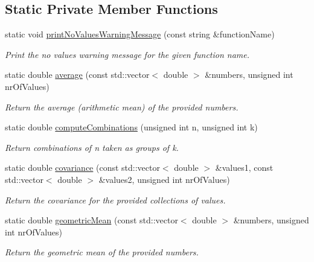 \subsection*{Static Private Member Functions}
\begin{DoxyCompactItemize}
\item 
static void \hyperlink{classmultiscale_1_1Numeric_afc1b351417949b1806e9faca7156d1a7}{print\-No\-Values\-Warning\-Message} (const string \&function\-Name)
\begin{DoxyCompactList}\small\item\em Print the no values warning message for the given function name. \end{DoxyCompactList}\item 
static double \hyperlink{classmultiscale_1_1Numeric_a0b02b3eadc399bb8d6a0d8cc3e5d9cf6}{average} (const std\-::vector$<$ double $>$ \&numbers, unsigned int nr\-Of\-Values)
\begin{DoxyCompactList}\small\item\em Return the average (arithmetic mean) of the provided numbers. \end{DoxyCompactList}\item 
static double \hyperlink{classmultiscale_1_1Numeric_a25ddac32c20b88732528d310dcc7a628}{compute\-Combinations} (unsigned int n, unsigned int k)
\begin{DoxyCompactList}\small\item\em Return combinations of n taken as groups of k. \end{DoxyCompactList}\item 
static double \hyperlink{classmultiscale_1_1Numeric_acc3adb44062cc1e70f697bd072e69b3b}{covariance} (const std\-::vector$<$ double $>$ \&values1, const std\-::vector$<$ double $>$ \&values2, unsigned int nr\-Of\-Values)
\begin{DoxyCompactList}\small\item\em Return the covariance for the provided collections of values. \end{DoxyCompactList}\item 
static double \hyperlink{classmultiscale_1_1Numeric_aaf89a75c6e933cd6e736f2ba4db0f76f}{geometric\-Mean} (const std\-::vector$<$ double $>$ \&numbers, unsigned int nr\-Of\-Values)
\begin{DoxyCompactList}\small\item\em Return the geometric mean of the provided numbers. \end{DoxyCompactList}\item 

\end{DoxyCompactItemize}
